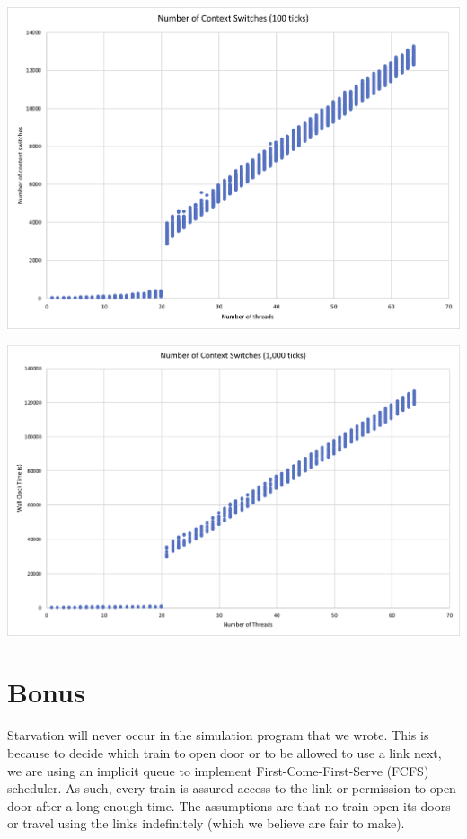 \documentclass[a4paper,12pt]{article}
\begin{document}
\begin{center}
	\includegraphics[width=0.9\linewidth]{100-cs}
\end{center}
\begin{center}
	\includegraphics[width=0.9\linewidth]{1000-cs}
\end{center}

\section{Bonus}
Starvation will never occur in the simulation program that we wrote. This is because to decide which train to open door or to be allowed to use a link next, we are using an implicit queue to implement First-Come-First-Serve (FCFS) scheduler. As such, every train is assured access to the link or permission to open door after a long enough time. The assumptions are that no train open its doors or travel using the links indefinitely (which we believe are fair to make).
\end{document}
